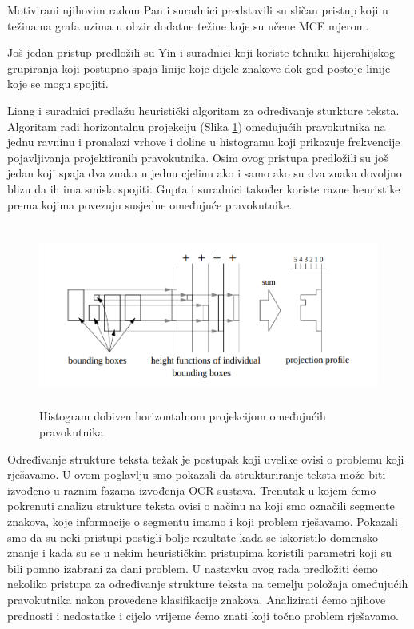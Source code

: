 \documentclass[times, utf8, zavrsni]{fer}
\begin{document}
Motivirani njihovim radom Pan i suradnici \citep{pan2011hybrid} predstavili su sličan pristup
koji u težinama grafa uzima u obzir dodatne težine koje su učene MCE  mjerom.

Još jedan pristup predložili su Yin i suradnici \citep{DBLP:journals/corr/abs-1301-2628} koji koriste
tehniku hijerahijskog grupiranja koji postupno spaja linije koje dijele znakove dok god
postoje linije koje se mogu spojiti. \citep{DBLP:journals/corr/TianPHLYT16}

Liang i suradnici \citep{liang1996document} predlažu heuristički algoritam za određivanje sturkture
teksta. Algoritam radi horizontalnu projekciju (Slika \ref{fig:histogram-projection}) omeđujućih pravokutnika na jednu ravninu i pronalazi
vrhove i doline u histogramu koji prikazuje frekvencije pojavljivanja projektiranih pravokutnika.
Osim ovog pristupa predložili su još jedan koji spaja dva znaka u jednu cjelinu ako i samo ako
su dva znaka dovoljno blizu da ih ima smisla spojiti. Gupta i suradnici \citep{gupta2006document} također koriste razne heuristike prema kojima
povezuju susjedne omeđujuće pravokutnike.

\pagebreak

\begin{figure}[htb]
    \centering
    \captionsetup{justification=centering,margin=2cm}
    \includegraphics[height=6cm]{images/histogram-projection.png}
    \caption{Histogram dobiven horizontalnom projekcijom omeđujućih pravokutnika \citep{liang1996document}}
    \label{fig:histogram-projection}
\end{figure}

Određivanje strukture teksta težak je postupak koji uvelike ovisi o problemu koji rješavamo. U ovom
poglavlju smo pokazali da strukturiranje teksta može biti izvođeno u raznim fazama izvođenja OCR
sustava. Trenutak u kojem ćemo pokrenuti analizu strukture teksta ovisi o načinu na koji smo
označili segmente znakova, koje informacije o segmentu imamo i koji problem rješavamo.
Pokazali smo da su neki pristupi postigli bolje rezultate kada se iskoristilo domensko znanje
i kada su se u nekim heurističkim pristupima koristili parametri koji su bili pomno
izabrani za dani problem.
U nastavku ovog rada predložiti ćemo nekoliko pristupa za određivanje strukture teksta na temelju položaja omeđujućih pravokutnika nakon provedene klasifikacije
znakova. Analizirati ćemo njihove prednosti i nedostatke i cijelo vrijeme ćemo znati koji točno problem rješavamo.
\end{document}

